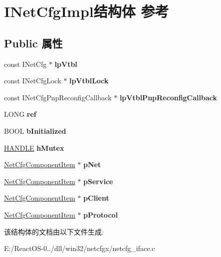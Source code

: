 \hypertarget{struct_i_net_cfg_impl}{}\section{I\+Net\+Cfg\+Impl结构体 参考}
\label{struct_i_net_cfg_impl}
\subsection*{Public 属性}
\begin{DoxyCompactItemize}
\item 
\mbox{\label{struct_i_net_cfg_impl_adace783ae099933950422814211322fe}} 
const I\+Net\+Cfg $\ast$ {\bfseries lp\+Vtbl}
\item 
\mbox{\label{struct_i_net_cfg_impl_a6528de6c47b1565095b93b42a27e47b3}} 
const I\+Net\+Cfg\+Lock $\ast$ {\bfseries lp\+Vtbl\+Lock}
\item 
\mbox{\label{struct_i_net_cfg_impl_a9751270d9206308d6793282680bbd095}} 
const I\+Net\+Cfg\+Pnp\+Reconfig\+Callback $\ast$ {\bfseries lp\+Vtbl\+Pnp\+Reconfig\+Callback}
\item 
\mbox{\label{struct_i_net_cfg_impl_a601dd6b874b09f90163016e7de92303e}} 
L\+O\+NG {\bfseries ref}
\item 
\mbox{\label{struct_i_net_cfg_impl_a44b9b70ab97387b7c1e3f97fd5a988fb}} 
B\+O\+OL {\bfseries b\+Initialized}
\item 
\mbox{\label{struct_i_net_cfg_impl_a9fd3abf9174d48c4c967034a042758c2}} 
\hyperlink{interfacevoid}{H\+A\+N\+D\+LE} {\bfseries h\+Mutex}
\item 
\mbox{\label{struct_i_net_cfg_impl_afab1a90dc0bfccc731240e0433e4c395}} 
\hyperlink{structtag_net_cfg_component_item}{Net\+Cfg\+Component\+Item} $\ast$ {\bfseries p\+Net}
\item 
\mbox{\label{struct_i_net_cfg_impl_ab63a6af0eb671d1b9f19bd0636b280d2}} 
\hyperlink{structtag_net_cfg_component_item}{Net\+Cfg\+Component\+Item} $\ast$ {\bfseries p\+Service}
\item 
\mbox{\label{struct_i_net_cfg_impl_a1b1ad49abecf5c0f00f5ea8d0ebd9476}} 
\hyperlink{structtag_net_cfg_component_item}{Net\+Cfg\+Component\+Item} $\ast$ {\bfseries p\+Client}
\item 
\mbox{\label{struct_i_net_cfg_impl_ae72a6f7e71ac012075847ccd4b758cfe}} 
\hyperlink{structtag_net_cfg_component_item}{Net\+Cfg\+Component\+Item} $\ast$ {\bfseries p\+Protocol}
\end{DoxyCompactItemize}


该结构体的文档由以下文件生成\+:\begin{DoxyCompactItemize}
\item 
E\+:/\+React\+O\+S-\/0../dll/win32/netcfgx/netcfg\+\_\+iface.\+c\end{DoxyCompactItemize}
